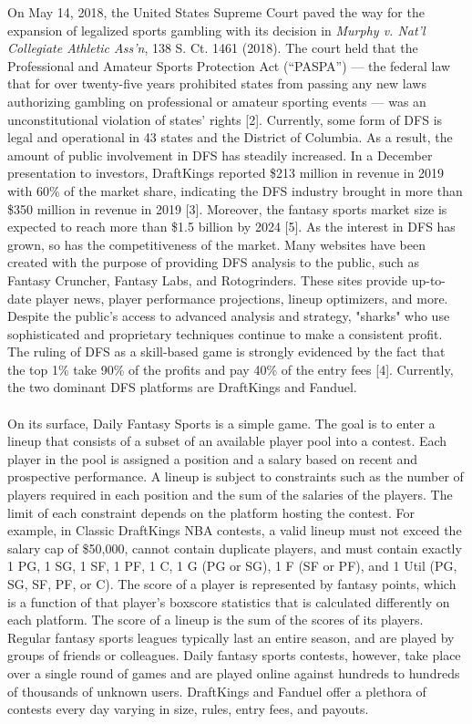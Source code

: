 \documentclass{article}
\begin{document}
On May 14, 2018, the United States Supreme Court paved the way for the expansion of legalized sports gambling with its decision in \textit{Murphy v. Nat’l Collegiate Athletic Ass’n}, 138 S. Ct. 1461 (2018). The court held that the Professional and Amateur Sports Protection Act (“PASPA”) — the federal law that for over twenty-five years prohibited states from passing any new laws authorizing gambling on professional or amateur sporting events — was an unconstitutional violation of states’ rights [2]. Currently, some form of DFS is legal and operational in 43 states and the District of Columbia. As a result, the amount of public involvement in DFS has steadily increased. In a December presentation to investors, DraftKings reported \$213 million in revenue in 2019 with 60\% of the market share, indicating the DFS industry brought in more than \$350 million in revenue in 2019 [3]. Moreover, the fantasy sports market size is expected to reach more than \$1.5 billion by 2024 [5]. As the interest in DFS has grown, so has the competitiveness of the market. Many websites have been created with the purpose of providing DFS analysis to the public, such as Fantasy Cruncher, Fantasy Labs, and Rotogrinders. These sites provide up-to-date player news, player performance projections, lineup optimizers, and more. Despite the public's access to advanced analysis and strategy, "sharks" who use sophisticated and proprietary techniques continue to make a consistent profit. The ruling of DFS as a skill-based game is strongly evidenced by the fact that the top 1\% take 90\% of the profits and pay 40\% of the entry fees [4]. Currently, the two dominant DFS platforms are DraftKings and Fanduel.\\
 \\
On its surface, Daily Fantasy Sports is a simple game. The goal is to enter a lineup that consists of a subset of an available player pool into a contest. Each player in the pool is assigned a position and a salary based on recent and prospective performance. A lineup is subject to constraints such as the number of players required in each position and the sum of the salaries of the players. The limit of each constraint depends on the platform hosting the contest. For example, in Classic DraftKings NBA contests, a valid lineup must not exceed the salary cap of \$50,000, cannot contain duplicate players, and must contain exactly 1 PG, 1 SG, 1 SF, 1 PF, 1 C, 1 G (PG or SG), 1 F (SF or PF), and 1 Util (PG, SG, SF, PF, or C). The score of a player is represented by fantasy points, which is a function of that player's boxscore statistics that is calculated differently on each platform. The score of a lineup is the sum of the scores of its players. Regular fantasy sports leagues typically last an entire season, and are played by groups of friends or colleagues. Daily fantasy sports contests, however, take place over a single round of games and are played online against hundreds to hundreds of thousands of unknown users. DraftKings and Fanduel offer a plethora of contests every day varying in size, rules, entry fees, and payouts.\\
\end{document}
